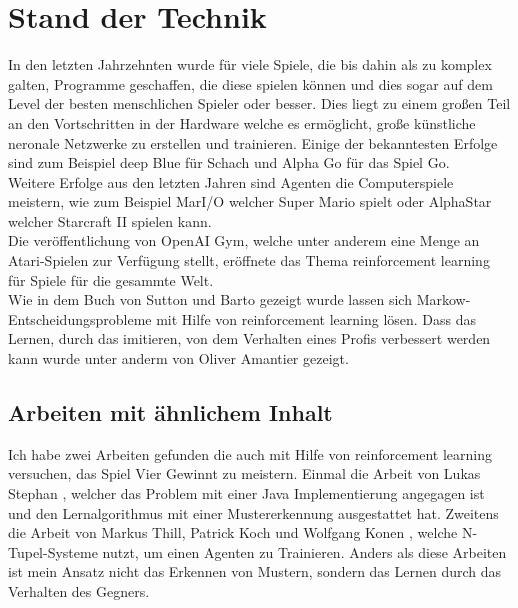 \chapter{Stand der Technik}
\label{cha:Technik}

In den letzten Jahrzehnten wurde für viele Spiele, die bis dahin als zu komplex galten, Programme geschaffen, die diese spielen können und dies sogar auf dem Level der besten menschlichen Spieler oder besser.
Dies liegt zu einem großen Teil an den Vortschritten in der Hardware welche es ermöglicht, große künstliche neronale Netzwerke zu erstellen und trainieren. Einige der bekanntesten Erfolge sind zum Beispiel deep Blue für Schach und Alpha Go für das Spiel Go.\cite{Sutton2018}\\
Weitere Erfolge aus den letzten Jahren sind Agenten die Computerspiele meistern, wie zum Beispiel MarI/O \cite{mario} welcher Super Mario spielt oder AlphaStar \cite{alphastar} welcher Starcraft II spielen kann.\\

Die veröffentlichung von OpenAI Gym\cite{gym}, welche unter anderem eine Menge an Atari-Spielen zur Verfügung stellt, eröffnete das Thema reinforcement learning für Spiele für die gesammte Welt. \\

Wie in dem Buch von Sutton und Barto \cite{Sutton2018} gezeigt wurde lassen sich Markow-Entscheidungsprobleme mit Hilfe von reinforcement learning lösen.   
Dass das Lernen, durch das imitieren, von dem Verhalten eines Profis verbessert werden kann wurde unter anderm von Oliver Amantier gezeigt. \cite{NIPS2016_6391,ARMANTIER2004221,price1999implicit}



\section{Arbeiten mit ähnlichem Inhalt}
Ich habe zwei Arbeiten gefunden die auch mit Hilfe von reinforcement learning versuchen, das Spiel Vier Gewinnt zu meistern. Einmal die Arbeit von Lukas Stephan \cite{Stephan2018}, welcher das Problem mit einer Java Implementierung angegagen ist und den Lernalgorithmus mit einer Mustererkennung ausgestattet hat. Zweitens die Arbeit von Markus Thill, Patrick Koch und Wolfgang Konen \cite{Thill2012}, welche N-Tupel-Systeme nutzt, um einen Agenten zu Trainieren. Anders als diese Arbeiten ist mein Ansatz nicht das Erkennen von Mustern, sondern das Lernen durch das Verhalten des Gegners.









